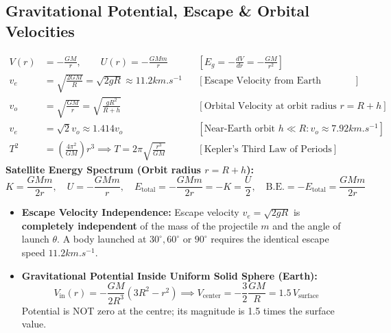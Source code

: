 \documentclass[11pt,a4paper]{article}
\begin{document}
\subsection{Gravitational Potential, Escape \& Orbital Velocities}

\begin{formulabox}
\begin{align}
  V(r) &= -\frac{GM}{r}, \qquad U(r) = -\frac{GMm}{r} && [E_g = -\frac{dV}{dr} = -\frac{GM}{r^2}] \\
  v_e &= \sqrt{\frac{2GM}{R}} = \sqrt{2gR} \approx 11.2\si{km.s^{-1}} && [\text{Escape Velocity from Earth Surface}] \\
  v_o &= \sqrt{\frac{GM}{r}} = \sqrt{\frac{g R^2}{R+h}} && [\text{Orbital Velocity at orbit radius } r = R+h] \\
  v_e &= \sqrt{2} v_o \approx 1.414 v_o && [\text{Near-Earth orbit } h \ll R: v_o \approx 7.92\si{km.s^{-1}}] \\
  T^2 &= \left(\frac{4\pi^2}{GM}\right)r^3 \implies T = 2\pi\sqrt{\frac{r^3}{GM}} && [\text{Kepler's Third Law of Periods}]
\end{align}
\textbf{Satellite Energy Spectrum (Orbit radius $r = R+h$):}
\begin{equation}
  K = \frac{GMm}{2r}, \quad U = -\frac{GMm}{r}, \quad E_{\text{total}} = -\frac{GMm}{2r} = -K = \frac{U}{2}, \quad \text{B.E.} = -E_{\text{total}} = \frac{GMm}{2r}
\end{equation}
\end{formulabox}

\begin{trapbox}
\begin{itemize}
  \item \textbf{Escape Velocity Independence:} Escape velocity $v_e = \sqrt{2gR}$ is \textbf{completely independent} of the mass of the projectile $m$ and the angle of launch $\theta$. A body launched at $30^\circ, 60^\circ$ or $90^\circ$ requires the identical escape speed $11.2\si{km.s^{-1}}$.
  \item \textbf{Gravitational Potential Inside Uniform Solid Sphere (Earth):}
  \begin{equation*}
    V_{\text{in}}(r) = -\frac{GM}{2R^3}\left(3R^2 - r^2\right) \implies V_{\text{center}} = -\frac{3}{2}\frac{GM}{R} = 1.5\,V_{\text{surface}}
  \end{equation*}
  Potential is NOT zero at the centre; its magnitude is 1.5 times the surface value.
\end{itemize}
\end{trapbox}
\end{document}
